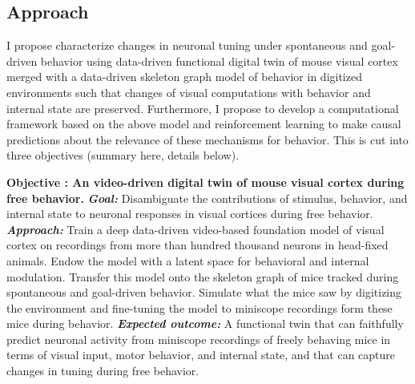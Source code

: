 \documentclass[COG,11pt]{ercgrant}
\begin{document}
\subsection{Approach}
I propose characterize changes in neuronal tuning under spontaneous and goal-driven behavior using data-driven functional digital twin of mouse visual cortex merged with a data-driven skeleton graph model of behavior in digitized environments such that changes of visual computations with behavior and internal state are preserved. Furthermore, I propose to develop a computational framework based on the above model and reinforcement learning to make causal predictions about the relevance of these mechanisms for behavior. This is cut into three objectives (summary here, details below).

\newcommand{\itbf}[1]{\textit{\textbf{#1}}}
\textbf{Objective : An video-driven digital twin of mouse visual cortex during free behavior. } \itbf{Goal:} Disambiguate the contributions of stimulus, behavior, and internal state to neuronal responses in visual cortices during free behavior. \itbf{Approach:} Train a deep data-driven video-based foundation model of visual cortex on recordings from more than hundred thousand neurons in head-fixed animals. Endow the model with a latent space for behavioral and internal modulation. Transfer this model onto the skeleton graph of mice tracked during spontaneous and goal-driven behavior. Simulate what the mice saw by digitizing the environment and fine-tuning the model to miniscope recordings form these mice during behavior. \itbf{Expected outcome:} A functional twin that can faithfully predict neuronal activity from miniscope recordings of freely behaving mice in terms of visual input, motor behavior, and internal state, and that can capture changes in tuning during free behavior. 
\end{document}
